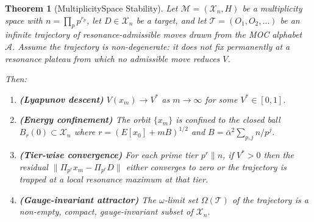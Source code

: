 \documentclass[11pt]{amsart}
\newtheorem{theorem}{Theorem}[section]
\newcommand{\M}{\mathcal{M}}
\newcommand{\X}{\mathcal{X}}
\newcommand{\Prj}{\Pi}
\newcommand{\norm}[1]{\lVert #1 \rVert}
\begin{document}
\begin{theorem}[MultiplicitySpace Stability]\label{thm:main}
Let $\M = (\X_n, H)$ be a multiplicity space with $n = \prod_p p^{r_p}$, let $D \in \X_n$ be a target, and let $\mathcal{T} = (O_1, O_2, \ldots)$ be an infinite trajectory of resonance-admissible moves drawn from the MOC alphabet $\mathcal{A}$. Assume the trajectory is \emph{non-degenerate}: it does not fix permanently at a resonance plateau from which no admissible move reduces $V$.

Then:
\begin{enumerate}
  \item[(i)] \textbf{(Lyapunov descent)} $V(x_m) \to V^*$ as $m \to \infty$ for some $V^* \in [0,1]$.
  \item[(ii)] \textbf{(Energy confinement)} The orbit $\{x_m\}$ is confined to the closed ball $B_r(0) \subset \X_n$ where $r = (E[x_0] + mB)^{1/2}$ and $B = \bar\alpha^2 \sum_{p,j} n/p^j$.
  \item[(iii)] \textbf{(Tier-wise convergence)} For each prime tier $p^r \| n$, if $V^* > 0$ then the residual $\norm{\Prj_{p^r} x_m - \Prj_{p^r} D}$ either converges to zero or the trajectory is trapped at a local resonance maximum at that tier.
  \item[(iv)] \textbf{(Gauge-invariant attractor)} The $\omega$-limit set $\Omega(\mathcal{T})$ of the trajectory is a non-empty, compact, gauge-invariant subset of $\X_n$.
\end{enumerate}
\end{theorem}
\end{document}
